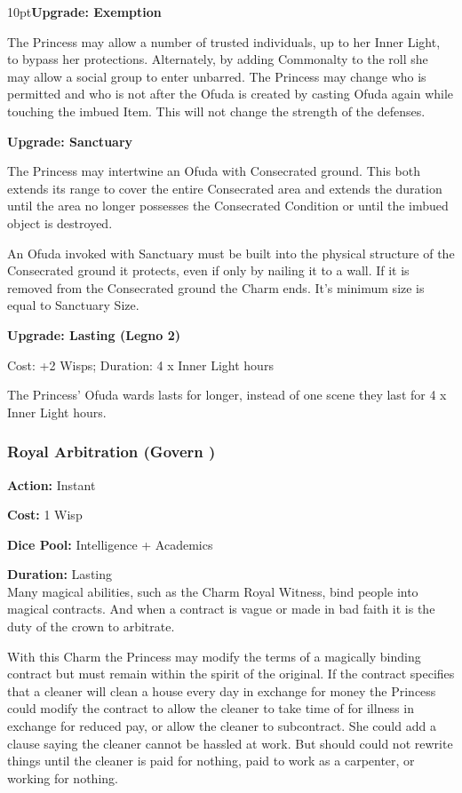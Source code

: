 \begin{myindentpar}{10pt}\textbf{Upgrade: Exemption}

The Princess may allow a number of trusted individuals, up to her Inner Light, to bypass her protections. Alternately, by adding Commonalty to the roll she may allow a social group to enter unbarred. The Princess may change who is permitted and who is not after the Ofuda is created by casting Ofuda again while touching the imbued Item. This will not change the strength of the defenses.

\textbf{Upgrade: Sanctuary}

The Princess may intertwine an Ofuda with Consecrated ground. This both extends its range to cover the entire Consecrated area and extends the duration until the area no longer possesses the Consecrated Condition or until the imbued object is destroyed.

An Ofuda invoked with Sanctuary must be built into the physical structure of the Consecrated ground it protects, even if only by nailing it to a wall. If it is removed from the Consecrated ground the Charm ends. It's minimum size is equal to Sanctuary Size.

\textbf{Upgrade: Lasting (Legno 2)}

Cost: +2 Wisps; Duration: 4 x Inner Light hours

The Princess' Ofuda wards lasts for longer, instead of one scene they last for 4 x Inner Light hours.\end{myindentpar}

\subsubsection*{Royal Arbitration (Govern \textbullet\textbullet\textbullet)}

\noindent \textbf{Action:} Instant 

\noindent \textbf{Cost:} 1 Wisp

\noindent \textbf{Dice Pool:} Intelligence + Academics

\noindent \textbf{Duration:} Lasting \\

Many magical abilities, such as the Charm Royal Witness, bind people into magical contracts. And when a contract is vague or made in bad faith it is the duty of the crown to arbitrate. 

With this Charm the Princess may modify the terms of a magically binding contract but must remain within the spirit of the original. If the contract specifies that a cleaner will clean a house every day in exchange for money the Princess could modify the contract to allow the cleaner to take time of for illness in exchange for reduced pay, or allow the cleaner to subcontract. She could add a clause saying the cleaner cannot be hassled at work. But should could not rewrite things until the cleaner is paid for nothing, paid to work as a carpenter, or working for nothing.

